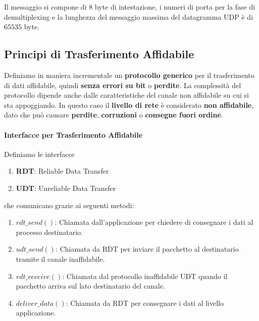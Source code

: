 \documentclass{article}
\begin{document}
Il messaggio si compone di $8$ byte di intestazione, i numeri di porta per la fase di demultiplexing e la lunghezza del messaggio massima del datagramma UDP è di $65535$ byte.

\newpage

\subsection{Principi di Trasferimento Affidabile}

Definiamo in maniera incrementale un \textbf{protocollo generico} per il trasferimento di dati affidabile, quindi \textbf{senza errori su bit} o \textbf{perdite}.
La complessità del protocollo dipende anche dalle caratteristiche del canale non affidabile su cui si sta appoggiando. In questo caso
il \textbf{livello di rete} è considerato \textbf{non affidabile}, dato che può causare \textbf{perdite}, \textbf{corruzioni} o \textbf{consegne fuori ordine}.

\paragraph{Interfacce per Trasferimento Affidabile} Definiamo le interfacce 

\begin{enumerate}
    \item \textbf{RDT}: Reliable Data Transfer
    \item \textbf{UDT}: Unreliable Data Transfer
\end{enumerate}

che comunicano grazie ai seguenti metodi:

\begin{enumerate}
    \item $rdt\_send()$: Chiamata dall'applicazione per chiedere di consegnare i dati al processo destinatario.
    \item $udt\_send()$: Chiamata da RDT per inviare il pacchetto al destinatario tramite il canale inaffidabile.
    \item $rdt\_receive()$: Chiamata dal protocollo inaffidabile UDT quando il pacchetto arriva sul lato destinatario del canale.
    \item $deliver\_data()$: Chiamata da RDT per consegnare i dati al livello applicazione.
\end{enumerate}

\vspace*{20px}
\end{document}
